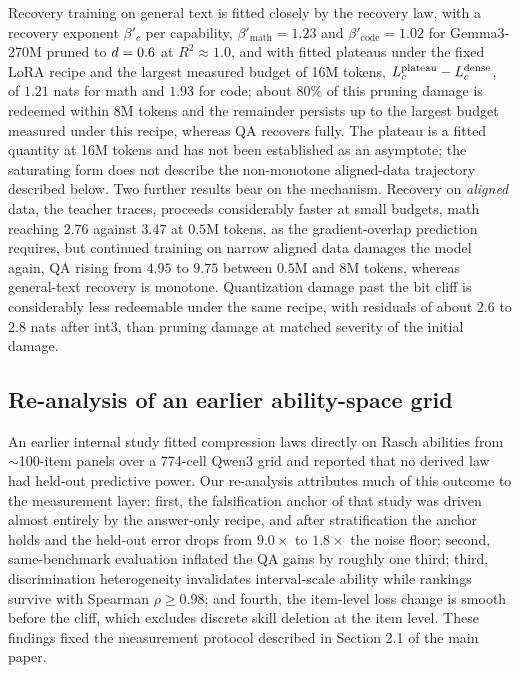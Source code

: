 Recovery training on general text is fitted closely by the recovery law, with a recovery exponent $\beta'_c$ per capability, $\beta'_{\text{math}}=1.23$ and $\beta'_{\text{code}}=1.02$ for Gemma3-270M pruned to $d=0.6$ at $R^2\approx1.0$, and with fitted plateaus under the fixed LoRA recipe and the largest measured
budget of 16M tokens, $L_{c}^{\text{plateau}}-L_{c}^{\text{dense}}$,
of $1.21$ nats for math and $1.93$ for code; about $80\%$ of this pruning
damage is redeemed within 8M tokens and the remainder persists up to
the largest budget measured under this recipe, whereas QA recovers
fully. The plateau is a fitted quantity at 16M tokens and has not been
established as an asymptote; the saturating form does not describe the
non-monotone aligned-data trajectory described below.  Two further results bear on the mechanism.
Recovery on \emph{aligned} data, the teacher traces, proceeds considerably faster at small budgets, math reaching $2.76$ against $3.47$ at $0.5$M tokens,
as the gradient-overlap prediction requires, but continued training on
narrow aligned data damages the model again, QA rising from $4.95$ to $9.75$ between $0.5$M and $8$M tokens, whereas general-text recovery is monotone. Quantization damage past the bit cliff is considerably less redeemable
under the same recipe, with residuals of about $2.6$ to $2.8$ nats after int3, than
pruning damage at matched severity of the initial damage.

\subsection{Re-analysis of an earlier ability-space grid}
\label{sec:app_cross}

An earlier internal study fitted compression laws directly on Rasch
abilities from $\sim$100-item panels over a 774-cell Qwen3 grid and
reported that no derived law had held-out predictive power. Our
re-analysis attributes much of this outcome to the measurement layer:
first, the falsification anchor of that study was driven almost entirely by the answer-only recipe, and after stratification the anchor holds and the held-out error drops from $9.0\times$ to $1.8\times$ the noise floor; second, same-benchmark evaluation inflated the QA gains by roughly one third; third, discrimination heterogeneity invalidates interval-scale ability while rankings survive with Spearman $\rho\ge0.98$; and fourth, the item-level loss change is smooth before the cliff, which excludes discrete skill deletion at the item level.
These findings fixed the measurement protocol described in Section 2.1 of the main paper.


